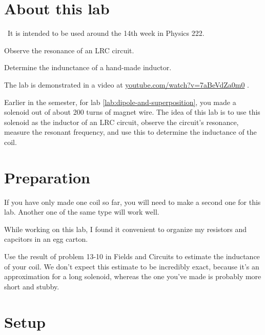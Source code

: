 \renewcommand\thechapter{c2.14}
\label{lab:ac-circuits}

\section*{About this lab}

\covid\ 
It is intended to be used around the 14th week in Physics 222.

\apparatus
{}

\begin{goals}

\item[] Observe the resonance of an LRC circuit.

\item[] Determine the indunctance of a hand-made inductor.
\end{goals}

\introduction

The lab is demonstrated in a video at
\url{youtube.com/watch?v=7aBeVdZa0m0} .

Earlier in the semester, for lab \ref{lab:dipole-and-superposition}, you 
made a solenoid out of about 200 turns of magnet wire. The idea of this
lab is to use this solenoid as the inductor of an LRC circuit, observe
the circuit's resonance, measure the resonant frequency, and use this
to determine the inductance of the coil.

\section*{Preparation}

If you have only made one coil so far, you will need to make a second one
for this lab. Another one of the same type will work well.

While working on this lab, I found it convenient to organize my resistors
and capcitors in an egg carton.

Use the result of problem 13-10 in Fields and Circuits to estimate the
inductance of your coil. We don't expect this estimate to be incredibly
exact, because it's an approximation for a long solenoid, whereas the
one you've made is probably more short and stubby.

\section*{Setup}

